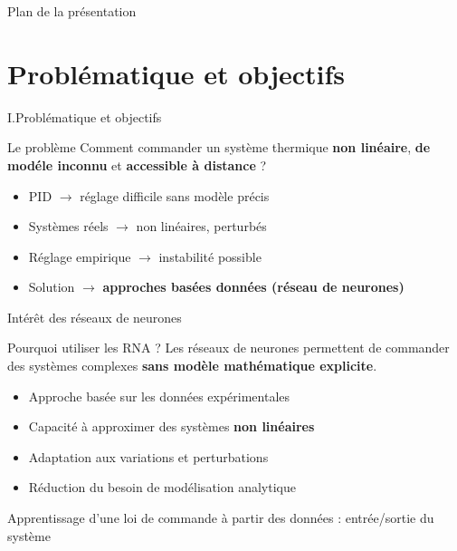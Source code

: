 \documentclass[aspectratio=169,12pt]{beamer}
\begin{document}
	\begin{frame}{\color{red} Plan de la présentation}
		\tableofcontents
	\end{frame}
	
	\section{Problématique et objectifs}
	\begin{frame}{\color{blue}I.Problématique et objectifs}		
		\begin{alertblock}{Le problème}
			Comment commander un système thermique \textbf{non linéaire}, 
			\textbf{de modéle inconnu} et \textbf{accessible à distance} ?
		\end{alertblock}
		\vspace{4pt}		
		\begin{itemize}
			\item PID $\rightarrow$ réglage difficile sans modèle précis
			\item Systèmes réels $\rightarrow$ non linéaires, perturbés
			\item Réglage empirique $\rightarrow$ instabilité possible
			\item Solution $\rightarrow$ \textbf{approches basées données (réseau de neurones)}
		\end{itemize}
	\end{frame}
	\begin{frame}{\color{red}Intérêt des réseaux de neurones}
		
		\begin{alertblock}{Pourquoi utiliser les RNA ?}
			Les réseaux de neurones permettent de commander des systèmes complexes 
			\textbf{sans modèle mathématique explicite}.
		\end{alertblock}
		
		\vspace{4pt}
		
		\begin{itemize}
			\item Approche basée sur les données expérimentales
			\item Capacité à approximer des systèmes \textbf{non linéaires}
			\item Adaptation aux variations et perturbations
			\item Réduction du besoin de modélisation analytique
		\end{itemize}
		
		\vspace{6pt}
		
		Apprentissage d’une loi de commande à partir des données :
		entrée/sortie du système
		
		
	\end{frame}
\end{document}

